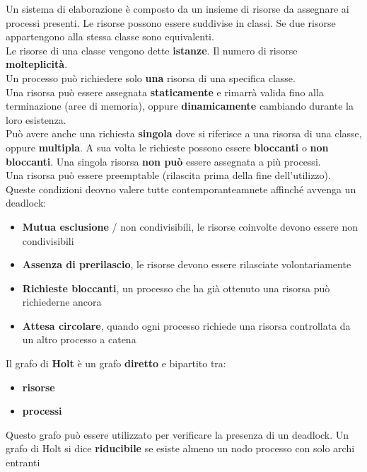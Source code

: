 \documentclass{article}
\begin{document}
Un sistema di elaborazione è composto da un insieme di risorse da assegnare ai processi presenti. Le risorse possono essere suddivise in classi. Se due risorse appartengono alla stessa classe sono equivalenti.\\ 
Le risorse di una classe vengono dette \textbf{istanze}. Il numero di risorse \textbf{molteplicità}. \\
Un processo può richiedere solo \textbf{una} risorsa di una specifica classe.\\
Una risorsa può essere assegnata \textbf{staticamente} e rimarrà valida fino alla terminazione (aree di memoria), oppure \textbf{dinamicamente} cambiando durante la loro esistenza.\\
Può avere anche una richiesta \textbf{singola} dove si riferisce a una risorsa di una classe, oppure \textbf{multipla}. A sua volta le richieste possono essere \textbf{bloccanti} o \textbf{non bloccanti}. Una singola risorsa \textbf{non può} essere assegnata a più processi.\\
Una risorsa può essere preemptable (rilascita prima della fine dell'utilizzo).
Queste condizioni deovno valere tutte contemporanteamnete affinché avvenga un deadlock:
\begin{itemize}
  \item \textbf{Mutua esclusione} / non condivisibili, le risorse coinvolte devono essere non condivisibili
  \item \textbf{Assenza di prerilascio}, le risorse devono essere rilasciate volontariamente
  \item \textbf{Richieste bloccanti}, un processo che ha già ottenuto una risorsa può richiederne ancora
  \item \textbf{Attesa circolare}, quando ogni processo richiede una risorsa controllata da un altro processo a catena
\end{itemize}
Il grafo di \textbf{Holt} è un grafo \textbf{diretto} e bipartito tra:
\begin{itemize}
  \item \textbf{risorse}
  \item \textbf{processi}
\end{itemize}
Questo grafo può essere utilizzato per verificare la presenza di un deadlock.
Un grafo di Holt si dice \textbf{riducibile} se esiste almeno un nodo processo con solo archi entranti
\end{document}
